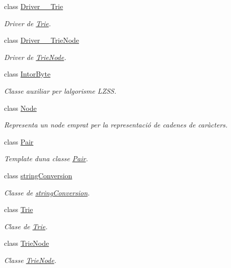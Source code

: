 \begin{DoxyCompactItemize}
class \hyperlink{classdomini_1_1utils_1_1Driver____Trie}{Driver\+\_\+\+\_\+\+Trie}
\begin{DoxyCompactList}\small\item\em Driver de \hyperlink{classdomini_1_1utils_1_1Trie}{Trie}. \end{DoxyCompactList}\item 
class \hyperlink{classdomini_1_1utils_1_1Driver____TrieNode}{Driver\+\_\+\+\_\+\+Trie\+Node}
\begin{DoxyCompactList}\small\item\em Driver de \hyperlink{classdomini_1_1utils_1_1TrieNode}{Trie\+Node}. \end{DoxyCompactList}\item 
class \hyperlink{classdomini_1_1utils_1_1IntorByte}{Intor\+Byte}
\begin{DoxyCompactList}\small\item\em Classe auxiliar per l\textquotesingle{}algorisme L\+Z\+SS. \end{DoxyCompactList}\item 
class \hyperlink{classdomini_1_1utils_1_1Node}{Node}
\begin{DoxyCompactList}\small\item\em Representa un node emprat per la representació de cadenes de caràcters. \end{DoxyCompactList}\item 
class \hyperlink{classdomini_1_1utils_1_1Pair}{Pair}
\begin{DoxyCompactList}\small\item\em Template d\textquotesingle{}una classe \hyperlink{classdomini_1_1utils_1_1Pair}{Pair}. \end{DoxyCompactList}\item 
class \hyperlink{classdomini_1_1utils_1_1stringConversion}{string\+Conversion}
\begin{DoxyCompactList}\small\item\em Classe de \hyperlink{classdomini_1_1utils_1_1stringConversion}{string\+Conversion}. \end{DoxyCompactList}\item 
class \hyperlink{classdomini_1_1utils_1_1Trie}{Trie}
\begin{DoxyCompactList}\small\item\em Clase de \hyperlink{classdomini_1_1utils_1_1Trie}{Trie}. \end{DoxyCompactList}\item 
class \hyperlink{classdomini_1_1utils_1_1TrieNode}{Trie\+Node}
\begin{DoxyCompactList}\small\item\em Classe \hyperlink{classdomini_1_1utils_1_1TrieNode}{Trie\+Node}. \end{DoxyCompactList}\end{DoxyCompactItemize}
